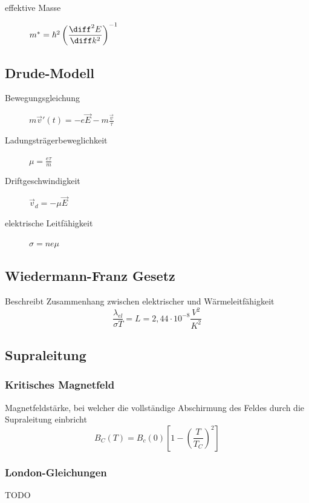 \begin{description}
    \item[effektive Masse] $m^*=\hbar^2\left(\dfrac{\diff^2 E}{\diff k^2}\right)^{-1}$
\end{description}

\subsection{Drude-Modell}
\begin{description}
    \item[Bewegungsgleichung] $m\vec v'(t) = -e\vec E-m\frac{\vec v}{\tau}$
    \item[Ladungsträgerbeweglichkeit] $\mu = \frac{e\tau}{m}$
    \item[Driftgeschwindigkeit] $\vec v_d=-\mu \vec E$
    \item[elektrische Leitfähigkeit] $\sigma = ne\mu$
\end{description}

\subsection{Wiedermann-Franz Gesetz}
Beschreibt Zusammenhang zwischen elektrischer und Wärmeleitfähigkeit
\begin{equation*}
    \frac{\lambda_{el}}{\sigma T} = L=2,44\cdot 10^{-8}\frac{V^2}{K^2}
\end{equation*}

\subsection{Supraleitung}
\subsubsection{Kritisches Magnetfeld}
Magnetfeldstärke, bei welcher die vollständige Abschirmung des Feldes durch die Supraleitung einbricht
\begin{equation*}
    B_C(T)=B_c(0)\left[1-\left(\frac{T}{T_C}\right)^2\right]
\end{equation*}

\subsubsection{London-Gleichungen}
TODO